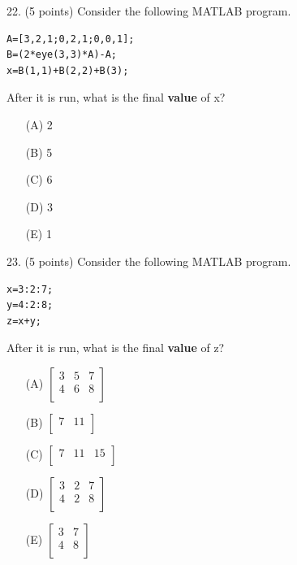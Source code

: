 \documentclass{article}
\begin{document}
\noindent
\begin{minipage}{\textwidth}
22. (5 points)
Consider the following MATLAB program.
\begin{verbatim}
A=[3,2,1;0,2,1;0,0,1];
B=(2*eye(3,3)*A)-A;
x=B(1,1)+B(2,2)+B(3);
\end{verbatim}
After it is run, what is the final \textbf{value} of x?

\begin{enumerate}
\item[(A)]
2

\item[(B)]
5

\item[(C)]
6

\item[(D)]
3

\item[(E)]
1

\end{enumerate}
\end{minipage}
\vspace{10em}
\filbreak\vfil{}\vfilneg

\noindent
\begin{minipage}{\textwidth}
23. (5 points)
Consider the following MATLAB program.
\begin{verbatim}
x=3:2:7;
y=4:2:8;
z=x+y;
\end{verbatim}
After it is run, what is the final \textbf{value} of z?

\begin{enumerate}
\item[(A)]
$ \left[ \begin{array}{ccc} 3 & 5 & 7 \\ 4 & 6 & 8 \\ \end{array} \right] $

\item[(B)]
$ \left[ \begin{array}{ccccc} 7 & 11 \\ \end{array} \right] $

\item[(C)]
$ \left[ \begin{array}{ccccc} 7 & 11 & 15 \\ \end{array} \right] $

\item[(D)]
$ \left[ \begin{array}{ccc} 3 & 2 & 7 \\ 4 & 2 & 8 \\ \end{array} \right] $

\item[(E)]
$ \left[ \begin{array}{cc} 3 & 7 \\ 4 & 8 \\ \end{array} \right] $

\end{enumerate}
\end{minipage}
\vspace{10em}
\filbreak\vfil{}\vfilneg
\end{document}
